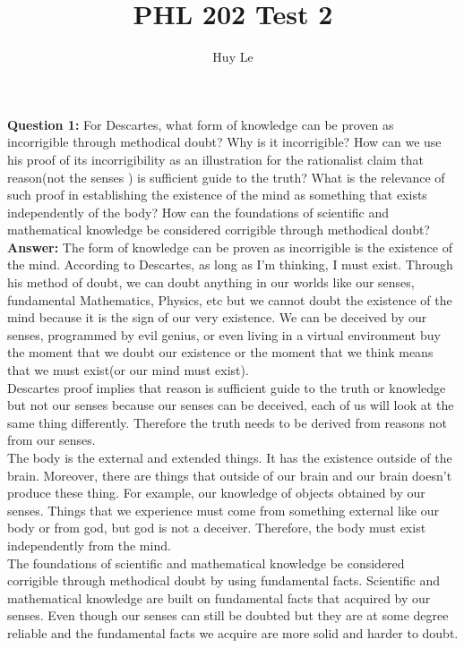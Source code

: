 \documentclass{article}
\begin{document}
\title{PHL 202 Test 2}
\author{Huy Le}
\maketitle
\doublespacing
\textbf{Question 1:} For Descartes, what form of knowledge can be proven as incorrigible through methodical doubt? Why is it incorrigible? How can we use his proof of its incorrigibility as an illustration for the rationalist claim that reason(not the senses ) is sufficient guide to the truth? What is the relevance of such proof in establishing the existence of the mind as something that exists independently of the body? How can the foundations of scientific and mathematical knowledge be considered corrigible through methodical doubt?\\
\indent \textbf{Answer: } The form of knowledge can be proven as incorrigible is the existence of the mind. According to Descartes, as long as I'm thinking, I must exist. Through his method of doubt, we can doubt anything in our worlds like our senses, fundamental Mathematics, Physics, etc but we cannot doubt the existence of the mind because it is the sign of our very existence. We can be deceived by our senses, programmed by evil genius, or even living in a virtual environment buy the moment that we doubt our existence or the moment that we think means that we must exist(or our mind must exist).\\
\indent Descartes proof implies that reason is sufficient guide to the truth or knowledge but not our senses because our senses can be deceived, each of us will look at the same thing differently. Therefore the truth needs to be derived from reasons not from our senses.\\
\indent The body is the external and extended things. It has the existence outside of the brain. Moreover, there are things that outside of our brain and our brain doesn't produce these thing. For example, our knowledge of objects obtained by our senses. Things that we experience must come from something external like our body or from god, but god is not a deceiver.  Therefore, the body must exist independently from the mind. \\
\indent The foundations of scientific and mathematical knowledge be considered corrigible through methodical doubt by using fundamental facts. Scientific and mathematical knowledge are built on fundamental facts that acquired by our senses. Even though our senses can still be doubted but they are at some degree reliable and the fundamental facts we acquire are more solid and harder to doubt.
\end{document}
